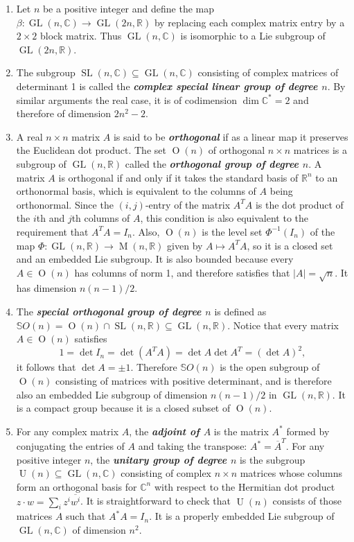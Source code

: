 \begin{example}
\begin{enumerate}
		\item Let $n$ be a positive integer and define the map $\beta:\operatorname{GL}(n,\mathbb{C})\to\operatorname{GL}(2n,\mathbb{R})$ by replacing each complex matrix entry by a $2\times 2$ block matrix. Thus $\operatorname{GL}(n,\mathbb{C})$ is isomorphic to a Lie subgroup of $\operatorname{GL}(2n,\mathbb{R})$.
		\item The subgroup $\operatorname{SL}(n,\mathbb{C})\subseteq\operatorname{GL}(n,\mathbb{C})$ consisting of complex matrices of determinant 1 is called the \textbf{\textit{complex special linear group of degree $n$}}. By similar arguments the real case, it is of codimension $\dim\mathbb{C}^*=2$ and therefore of dimension $2n^2-2$.
		\item A real $n\times n$ matrix $A$ is said to be \textbf{\textit{orthogonal}} if as a linear map it preserves the Euclidean dot product. The set $\operatorname{O}(n)$ of orthogonal $n\times n$ matrices is a subgroup of $\operatorname{GL}(n,\mathbb{R})$ called the \textbf{\textit{orthogonal group of degree $n$}}. A matrix $A$ is orthogonal if and only if it takes the standard basis of $\mathbb{R}^n$ to an orthonormal basis, which is equivalent to the columns of $A$ being orthonormal. Since the $(i,j)$-entry of the matrix $A^TA$ is the dot product of the $i$th and $j$th columns of $A$, this condition is also equivalent to the requirement that $A^TA=I_n$. Also, $\operatorname{O}(n)$ is the level set $\Phi^{-1}(I_n)$ of the map $\Phi:\operatorname{GL}(n,\mathbb{R})\to\operatorname{M}(n,\mathbb{R})$ given by $A\mapsto A^TA$, so it is a closed set and an embedded Lie subgroup. It is also bounded because every $A\in\operatorname{O}(n)$ has columns of norm 1, and therefore satisfies that $|A|=\sqrt{n}$. It has dimension $n(n-1)/2$.
		\item The \textbf{\textit{special orthogonal group of degree $n$}} is defined as $\mathbb{S}O(n)=\operatorname{O}(n)\cap\operatorname{SL}(n,\mathbb{R})\subseteq\operatorname{GL}(n,\mathbb{R})$. Notice that every matrix $A\in\operatorname{O}(n)$ satisfies
		\[1=\det I_n=\det(A^TA)=\det A\det A^T=(\det A)^2,\]
		it follows that $\det A=\pm1$. Therefore $\mathbb{S}O(n)$ is the open subgroup of $\operatorname{O}(n)$ consisting of matrices with positive determinant, and is therefore also an embedded Lie subgroup of dimension $n(n-1)/2$ in $\operatorname{GL}(n,\mathbb{R})$. It is a compact group because it is a closed subset of $\operatorname{O}(n)$.
		\item For any complex matrix $A$, the \textbf{\textit{adjoint of $A$}} is the matrix $A^*$ formed by conjugating the entries of $A$ and taking the transpose: $A^*=\overline{A}^T$. For any positive integer $n$, the \textbf{\textit{unitary group of degree $n$}} is the subgroup $\operatorname{U}(n)\subseteq\operatorname{GL}(n,\mathbb{C})$ consisting of complex $n\times n$ matrices whose columns form an orthogonal basis for $\mathbb{C}^n$ with respect to the Hermitian dot product $z\cdot w=\sum_iz^i\overline{w^i}$. It is straightforward to check that $\operatorname{U}(n)$ consists of those matrices $A$ such that $A^*A=I_n$. It is a properly embedded Lie subgroup of $\operatorname{GL}(n,\mathbb{C})$ of dimension $n^2$.

\end{enumerate}
\end{example}
